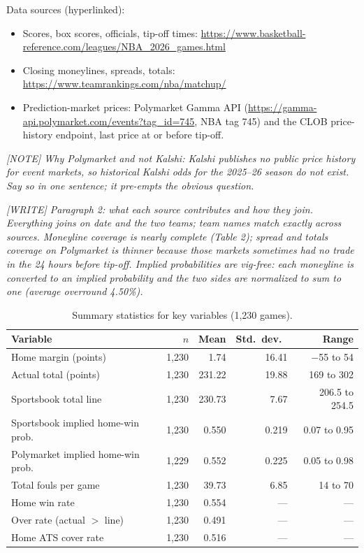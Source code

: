 \documentclass[12pt,letterpaper]{article}
\newcommand{\writeprompt}[1]{{\color{gray}\textit{[WRITE] #1}}}
\newcommand{\authnote}[1]{{\color{gray}\textit{[NOTE] #1}}}
\begin{document}
Data sources (hyperlinked):
\begin{itemize}
\item Scores, box scores, officials, tip-off times: \url{https://www.basketball-reference.com/leagues/NBA_2026_games.html}
\item Closing moneylines, spreads, totals: \url{https://www.teamrankings.com/nba/matchup/}
\item Prediction-market prices: Polymarket Gamma API (\url{https://gamma-api.polymarket.com/events?tag_id=745}, NBA tag 745) and the CLOB price-history endpoint, last price at or before tip-off.
\end{itemize}

\authnote{Why Polymarket and not Kalshi: Kalshi publishes no public price
history for event markets, so historical Kalshi odds for the 2025--26 season
do not exist. Say so in one sentence; it pre-empts the obvious question.}

\writeprompt{Paragraph 2: what each source contributes and how they join.
Everything joins on date and the two teams; team names match exactly across
sources. Moneyline coverage is nearly complete (Table 2); spread and totals
coverage on Polymarket is thinner because those markets sometimes had no
trade in the 24 hours before tip-off. Implied probabilities are vig-free:
each moneyline is converted to an implied probability and the two sides are
normalized to sum to one (average overround 4.50\%).}

\begin{table}[htbp]
\centering
\caption{Summary statistics for key variables (1,230 games).}
\label{tab:summary}
\begin{tabular}{lrrrr}
\hline
Variable & $n$ & Mean & Std.\ dev.\ & Range \\
\hline
Home margin (points) & 1,230 & 1.74 & 16.41 & $-$55 to 54 \\
Actual total (points) & 1,230 & 231.22 & 19.88 & 169 to 302 \\
Sportsbook total line & 1,230 & 230.73 & 7.67 & 206.5 to 254.5 \\
Sportsbook implied home-win prob.\ & 1,230 & 0.550 & 0.219 & 0.07 to 0.95 \\
Polymarket implied home-win prob.\ & 1,229 & 0.552 & 0.225 & 0.05 to 0.98 \\
Total fouls per game & 1,230 & 39.73 & 6.85 & 14 to 70 \\
Home win rate & 1,230 & 0.554 & --- & --- \\
Over rate (actual $>$ line) & 1,230 & 0.491 & --- & --- \\
Home ATS cover rate & 1,230 & 0.516 & --- & --- \\
\hline
\end{tabular}
\end{table}
\end{document}
